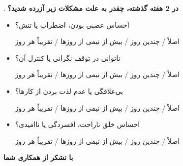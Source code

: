 . \textbf{در 2 هفته گذشته، چقدر به علت مشکلات زیر آزرده شدید؟}
\begin{itemize}
  \item احساس عصبی بودن، اضطراب یا تنش؟

  اصلاً \checkbox{} / چندین روز \checkbox{} / بیش از نیمی از روزها \checkbox{} / تقریباً هر روز \checkbox{}

  \item ناتوانی در توقف نگرانی یا کنترل آن؟

  اصلاً \checkbox{} / چندین روز \checkbox{} / بیش از نیمی از روزها \checkbox{} / تقریباً هر روز \checkbox{}

  \item بی‌علاقگی یا عدم لذت بردن از کارها؟

  اصلاً \checkbox{} / چندین روز \checkbox{} / بیش از نیمی از روزها \checkbox{} / تقریباً هر روز \checkbox{}

  \item احساس خلق ناراحت، افسردگی یا ناامیدی؟

  اصلاً \checkbox{} / چندین روز \checkbox{} / بیش از نیمی از روزها \checkbox{} / تقریباً هر روز \checkbox{}
\end{itemize}

\begin{center}
\textbf{با تشکر از همکاری شما}
\end{center}

